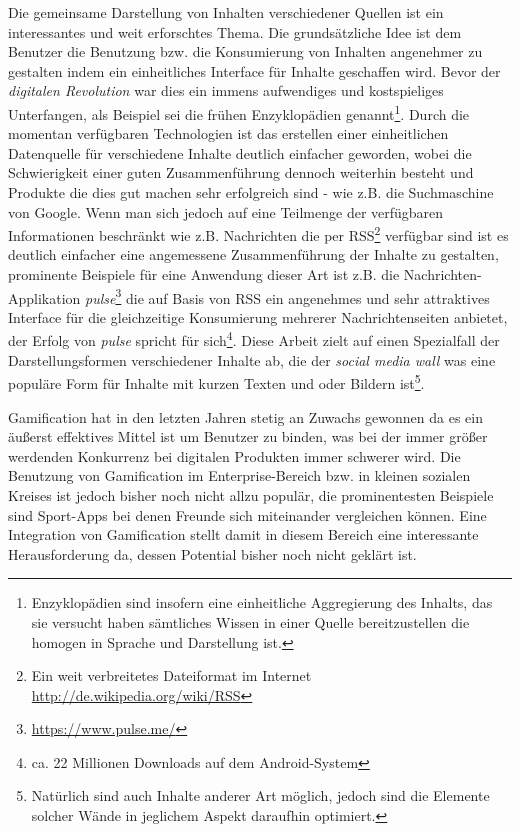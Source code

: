 \documentclass[12pt,twoside]{book}
\begin{document}
Die gemeinsame Darstellung von Inhalten verschiedener Quellen ist ein interessantes und weit erforschtes Thema. Die grundsätzliche Idee ist dem Benutzer die Benutzung bzw. die Konsumierung von Inhalten angenehmer zu gestalten indem ein einheitliches Interface für Inhalte geschaffen wird. Bevor der \textit{digitalen Revolution} war dies ein immens aufwendiges und kostspieliges Unterfangen, als Beispiel sei die frühen Enzyklopädien genannt\footnote{Enzyklopädien sind insofern eine einheitliche Aggregierung des Inhalts, das sie versucht haben sämtliches Wissen in einer Quelle bereitzustellen die homogen in Sprache und Darstellung ist.}. Durch die momentan verfügbaren Technologien ist das erstellen einer einheitlichen Datenquelle für verschiedene Inhalte deutlich einfacher geworden, wobei die Schwierigkeit einer guten Zusammenführung dennoch weiterhin besteht und Produkte die dies gut machen sehr erfolgreich sind - wie z.B. die Suchmaschine von Google.
Wenn man sich jedoch auf eine Teilmenge der verfügbaren Informationen beschränkt wie z.B. Nachrichten die per RSS\footnote{Ein weit verbreitetes Dateiformat im Internet \url{http://de.wikipedia.org/wiki/RSS}} verfügbar sind ist es deutlich einfacher eine angemessene Zusammenführung der Inhalte zu gestalten, prominente Beispiele für eine Anwendung dieser Art ist z.B. die Nachrichten-Applikation \textit{pulse}\footnote{\url{https://www.pulse.me/}} die auf Basis von RSS ein angenehmes und sehr attraktives Interface für die gleichzeitige Konsumierung mehrerer Nachrichtenseiten anbietet, der Erfolg von \textit{pulse} spricht für sich\footnote{ca. 22 Millionen Downloads auf dem Android-System}. Diese Arbeit zielt auf einen Spezialfall der Darstellungsformen verschiedener Inhalte ab, die der \textit{social media wall} was eine populäre Form für Inhalte mit kurzen Texten und oder Bildern ist\footnote{Natürlich sind auch Inhalte anderer Art möglich, jedoch sind die Elemente solcher Wände in jeglichem Aspekt daraufhin optimiert.}.

Gamification hat in den letzten Jahren stetig an Zuwachs gewonnen da es ein äußerst effektives Mittel ist um Benutzer zu binden, was bei der immer größer werdenden Konkurrenz bei digitalen Produkten immer schwerer wird. Die Benutzung von Gamification im Enterprise-Bereich bzw. in kleinen sozialen Kreises ist jedoch bisher noch nicht allzu populär, die prominentesten Beispiele sind Sport-Apps bei denen Freunde sich miteinander vergleichen können. Eine Integration von Gamification stellt damit in diesem Bereich eine interessante Herausforderung da, dessen Potential bisher noch nicht geklärt ist.
\end{document}
